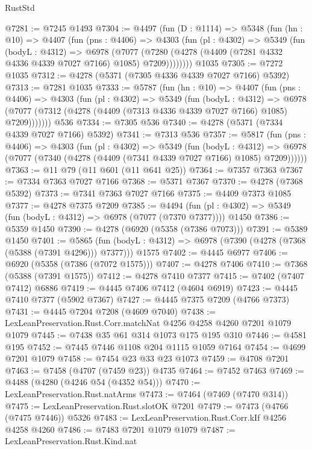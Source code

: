 \begin{lexlean}{RustStd}
\begin{coremodule}
@7281 := @7245 @1493
@7304 := @4497
    (fun (D : @1114) =>
    @5348
      (fun (hn : @10) =>
      @4407
        (fun (pns : @4406) =>
        @4303
          (fun (pl : @4302) =>
          @5349
            (fun (bodyL : @4312) =>
            @6978
              (@7077 (@7280 (@4278 (@4409 (@7281 @4332 @4336 @4339 @7027 @7166) @1085) @7209))))))))
    @1035
@7305 := @7272 @1035
@7312 := @4278 (@5371 (@7305 @4336 @4339 @7027 @7166) @5392)
@7313 := @7281 @1035
@7333 := @5787
    (fun (hn : @10) =>
    @4407
      (fun (pns : @4406) =>
      @4303
        (fun (pl : @4302) =>
        @5349
          (fun (bodyL : @4312) =>
          @6978 (@7077 (@7312 (@4278 (@4409 (@7313 @4336 @4339 @7027 @7166) @1085) @7209)))))))
    @536
@7334 := @7305 @536
@7340 := @4278 (@5371 (@7334 @4339 @7027 @7166) @5392)
@7341 := @7313 @536
@7357 := @5817
    (fun (pns : @4406) =>
    @4303
      (fun (pl : @4302) =>
      @5349
        (fun (bodyL : @4312) =>
        @6978 (@7077 (@7340 (@4278 (@4409 (@7341 @4339 @7027 @7166) @1085) @7209))))))
@7363 := @11 @79 (@11 @601 (@11 @641 @25))
@7364 := @7357 @7363
@7367 := @7334 @7363 @7027 @7166
@7368 := @5371 @7367
@7370 := @4278 (@7368 @5392)
@7373 := @7341 @7363 @7027 @7166
@7375 := @4409 @7373 @1085
@7377 := @4278 @7375 @7209
@7385 := @4494
    (fun (pl : @4302) => @5349 (fun (bodyL : @4312) => @6978 (@7077 (@7370 @7377))))
    @1450
@7386 := @5359 @1450
@7390 := @4278 (@6920 (@5358 (@7386 @7073)))
@7391 := @5389 @1450
@7401 := @5865
    (fun (bodyL : @4312) => @6978 (@7390 (@4278 (@7368 (@5388 (@7391 @4296))) @7377)))
    @1575
@7402 := @4445 @6977
@7406 := @6920 (@5358 (@7386 (@7072 @1575)))
@7407 := @4278 @7406
@7410 := @7368 (@5388 (@7391 @1575))
@7412 := @4278 @7410 @7377
@7415 := @7402 (@7407 @7412) @6886
@7419 := @4445 @7406 @7412 (@4604 @6919)
@7423 := @4445 @7410 @7377 (@5902 @7367)
@7427 := @4445 @7375 @7209 (@4766 @7373)
@7431 := @4445 @7204 @7208 (@4609 @7040)
@7438 := LexLeanPreservation.Rust.Corr.matchNat @4256 @4258 @4260 @7201 @1079 @1079
@7445 := @7438 @35 @61 @314 @1073 @175 @195 @310
@7446 := @4581 @195
@7452 := @7445 @7446 @1108 @204 @1115 @1059 @7164
@7454 := @4699 @7201 @1079
@7458 := @7454 @23 @33 @23 @1073
@7459 := @4708 @7201
@7463 := @7458 (@4707 (@7459 @23)) @4735
@7464 := @7452 @7463
@7469 := @4488 (@4280 (@4246 @54 (@4352 @54)))
@7470 := LexLeanPreservation.Rust.natArms
@7473 := @7464 (@7469 (@7470 @314))
@7475 := LexLeanPreservation.Rust.slotOK @7201
@7479 := @7473 (@4766 (@7475 @7446)) @5326
@7483 := LexLeanPreservation.Rust.Corr.kIf @4256 @4258 @4260
@7486 := @7483 @7201 @1079 @1079
@7487 := LexLeanPreservation.Rust.Kind.nat

\end{coremodule}
\end{lexlean}
